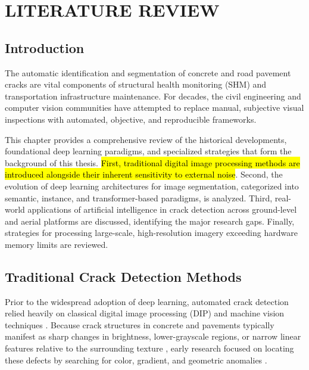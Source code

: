 \chapter{LITERATURE REVIEW}

\section{Introduction}

\hs The automatic identification and segmentation of concrete and road pavement cracks are vital components of structural health monitoring (SHM) and transportation infrastructure maintenance. For decades, the civil engineering and computer vision communities have attempted to replace manual, subjective visual inspections with automated, objective, and reproducible frameworks.

\hs This chapter provides a comprehensive review of the historical developments, foundational deep learning paradigms, and specialized strategies that form the background of this thesis. \hl{First, traditional digital image processing methods are introduced alongside their inherent sensitivity to external noise}. Second, the evolution of deep learning architectures for image segmentation, categorized into semantic, instance, and transformer-based paradigms, is analyzed. Third, real-world applications of artificial intelligence in crack detection across ground-level and aerial platforms are discussed, identifying the major research gaps. Finally, strategies for processing large-scale, high-resolution imagery exceeding hardware memory limits are reviewed.

\section{Traditional Crack Detection Methods}

\hs Prior to the widespread adoption of deep learning, automated crack detection relied heavily on classical digital image processing (DIP) and machine vision techniques \cite{zhang-2024a}. Because crack structures in concrete and pavements typically manifest as sharp changes in brightness, lower-grayscale regions, or narrow linear features relative to the surrounding texture \cite{zhen-liang-2025,liu-2019}, early research focused on locating these defects by searching for color, gradient, and geometric anomalies \cite{zhen-liang-2025}.

